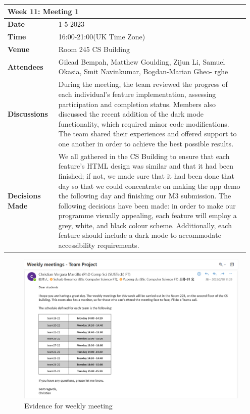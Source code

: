 \documentclass[a4paper]{article}
\begin{document}
{\noindent\begin{tabular}{|p{0.2\linewidth}|p{0.75\linewidth}|} 
	\hline
 \multicolumn{2}{|l|}{\textbf{Week 11: Meeting 1}}\\
 \hline
 \textbf{Date} & 1-5-2023\\
 \hline
 \textbf{Time} & 16:00-21:00(UK Time Zone)\\
 \hline
 \textbf{Venue} & Room 245 CS Building\\
 \hline
 {\textbf{Attendees}} &  Gilead Bempah, Matthew Goulding, Zijun Li, Samuel Okasia, Smit Navinkumar, Bogdan-Marian Gheo-
 rghe\\
 \hline
 {\textbf{Discussions}} & During the meeting, the team reviewed the progress of each individual's feature implementation, assessing participation and completion status. Members also discussed the recent addition of the dark mode functionality, which required minor code modifications. The team shared their experiences and offered support to one another in order to achieve the best possible results.\\
 \hline
 {\textbf{Decisions Made}} & We all gathered in the CS Building to ensure that each feature's HTML design was similar and that it had been finished; if not, we made sure that it had been done that day so that we could concentrate on making the app demo the following day and finishing our M3 submission.
 The following decisions have been made: in order to make our programme visually appealing, each feature will employ a grey, white, and black colour scheme. Additionally, each feature should include a dark mode to accommodate accessibility requirements. \\
 \hline
\end{tabular}}

\begin{figure}
	\includegraphics[width=\linewidth]{./image/meeting.png}
	\caption*{Evidence for weekly meeting}
\end{figure}
\end{document}
